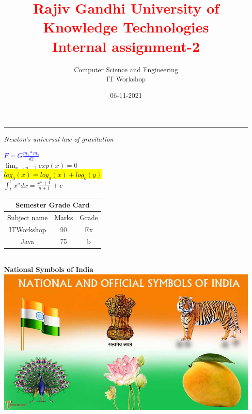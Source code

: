 \documentclass{article}
\title{\bf{\textcolor{red}{Rajiv Gandhi University of Knowledge Technologies\\Internal assignment-2}}}
\author{Computer Science and Engineering\\IT Workshop}
\date{06-11-2021}
\begin{document}
\maketitle
\hrule
\vspace{5mm}
\Large{\textit{Newton's universal law of gravitation}}\\
\begin{center}
\textcolor{blue}{$F=G\frac{m_1*m_2}{d2}$}\\
\vspace{3mm}
$\lim_{x \to n-1}exp(x)=0$\\
\vspace{3mm}
\colorbox{yellow}{$log_a(x)=log_a(x)+log_b(y)$}\\
\vspace{3mm}
$\int_l^1x^ndx=\frac{x^n+1}{n+1}+c$\\
\vspace{5mm}
\begin{tabular}{|c |c| c|}
\hline
\multicolumn{3}{|c|}{\bf{Semester Grade Card}}\\
\hline
Subject name & Marks & Grade\\
\hline
ITWorkshop & 90 & Ex\\
\hline
Java & 75 & b\\
\hline
\end{tabular}\\
\vspace{5mm}
{\bf{National Symbols of India}}\\
\vspace{5mm}
\includegraphics[scale=0.5]{india}
\end{center}
\end{document}
